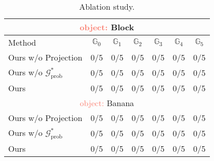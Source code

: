 \begin{table}[!t]
  \begin{center}
    \caption{Ablation study.}
    \label{tab:ablation}
    \begin{tabular}{l|c|c|c|c|c|c} 
        \toprule[1.5pt]
        \midrule[0.2pt]
        \multicolumn{7}{c}{\textcolor{Salmon}{object:} {Block}}\\
        \midrule
       Method & $\mathbb{G}_0$ & $\mathbb{G}_1$ & $\mathbb{G}_2$ & $\mathbb{G}_3$ & $\mathbb{G}_4$ & $\mathbb{G}_5$ \\
      \midrule
      Ours w/o Projection & 0/5 & 0/5 & 0/5 & 0/5 & 0/5 & 0/5 \\
      Ours w/o $\mathcal{G}^*_{\text{prob}}$ & 0/5 & 0/5 & 0/5 & 0/5 & 0/5 & 0/5 \\
      Ours & 0/5 & 0/5 & 0/5 & 0/5 & 0/5 & 0/5 \\
    \midrule[0.2pt]
    
    \multicolumn{7}{c}{\textcolor{Salmon}{object:} {Banana}}\\
    \midrule
    Ours w/o Projection & 0/5 & 0/5 & 0/5 & 0/5 & 0/5 & 0/5 \\
      Ours w/o $\mathcal{G}^*_{\text{prob}}$ & 0/5 & 0/5 & 0/5 & 0/5 & 0/5 & 0/5 \\
      Ours & 0/5 & 0/5 & 0/5 & 0/5 & 0/5 & 0/5 \\
    \midrule[0.2pt]\bottomrule[1.5pt]
    \end{tabular}
  \end{center}
  
\end{table} 